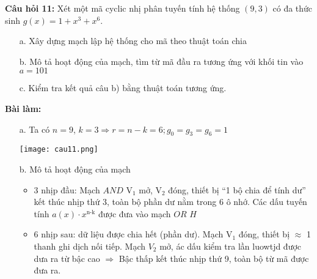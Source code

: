 \documentclass[12pt]{article}
\begin{document}
\newpage
\textbf{Câu hỏi 11:} Xét một mã cyclic nhị phân tuyến tính hệ thống $(9,3)$ có đa thức sinh $g(x) = 1 + x^3 + x^6$.
\begin{enumerate}
    \item[a.] Xây dựng mạch lập hệ thống cho mã theo thuật toán chia 
    \item[b.] Mô tả hoạt động của mạch, tìm từ mã đầu ra tương ứng với khối tin vào $a = 101$
    \item[c.] Kiểm tra kết quả câu b) bằng thuật toán tương ứng.
\end{enumerate}
\par\noindent\textbf{Bài làm:}
\begin{itemize}
    \item [a.] Ta có $ n=9$, $k= 3 \Rightarrow r = n-k =6; g_0 = g_3 = g_6 = 1$\\
    \begin{center}
        \texttt{[image: cau11.png]}
    \end{center}   
    \item [b. ] Mô tả hoạt động của mạch    
    \begin{itemize}
        \item 3 nhịp đầu: Mạch  $AND$ V$_1$ mở, V$_2$ đóng, thiết bị ``1 bộ chia để tính dư'' kết thúc nhịp thứ 3, toàn bộ phần dư nằm trong 6 ô nhớ. Các dấu tuyến tính $a(x)\cdot x^\text{n-k}$ được đưa vào mạch $OR$ $H$
        \item 6 nhịp sau: dữ liệu được chia hết (phần dư). Mạch V$_1$ đóng, thiết bị $\approx $ 1 thanh ghi dịch nối tiếp. Mạch $V_2$ mở, ác dấu kiểm tra lần luowtjd được dưa ra từ bậc cao $\Rightarrow$ Bậc thấp kết thúc nhịp thứ 9, toàn bộ từ mã được đưa ra.
    \end{itemize}
    
    

\end{itemize}
\end{document}
